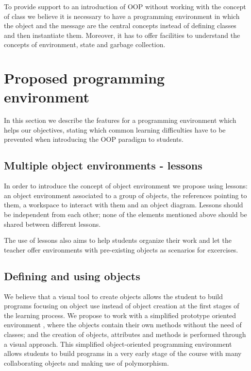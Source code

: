 \documentclass{sigplanconf}
\begin{document}
To provide support to an introduction of OOP without working with the concept of class we believe it is necessary to have a programming environment in which the object and the message are the central concepts instead of defining classes and then instantiate them.
Moreover, it has to offer facilities to understand the concepts of environment, state and garbage collection.

\section{Proposed programming environment}

In this section we describe the features for a programming environment which helps our objectives, 
stating which common learning difficulties have to be prevented when introducing the OOP paradigm to students. 

\subsection{Multiple object environments - lessons}

In order to introduce the concept of object environment we propose using lessons: an object environment associated to a group of objects, the references pointing to them, a workspace to interact with them and an object diagram. Lessons should be independent from each other; none of the elements mentioned above should be shared between different lessons.

The use of lessons also aims to help students organize their work and let the teacher offer environments with pre-existing objects as scenarios for excercises.

\subsection{Defining and using objects}
We believe that a visual tool to create objects allows the student to build programs focusing on object use instead of object creation at the first stages of the learning process. We propose to work with a simplified prototype oriented environment \cite{Wilk02,Mads96}, where the objects contain their own methods without the need of classes; and the creation of objects, attributes and methods is performed through a visual approach. This simplified object-oriented programming environment allows students to build programs in a very early stage of the course with many collaborating objects and making use of polymorphism.
\end{document}
